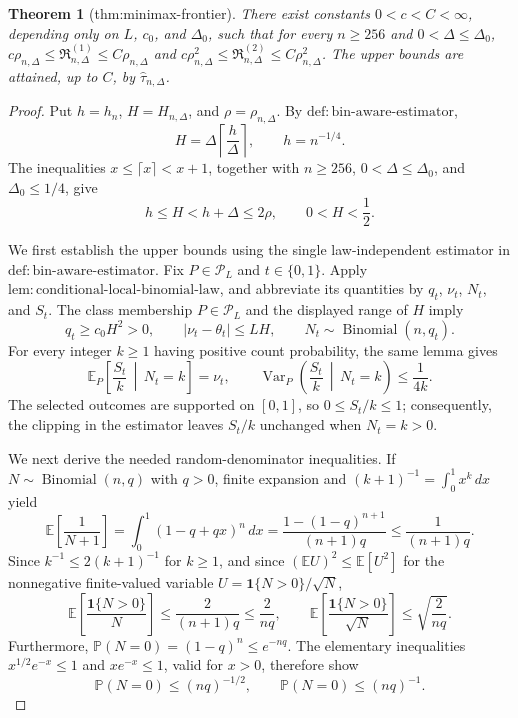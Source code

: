 \documentclass{article}
\newtheorem{theorem}{Theorem}
\begin{document}
\begin{theorem}[thm:minimax-frontier]\label{thm:minimax-frontier}
There exist constants \(0<c<C<\infty\), depending only on \(L\), \(c_0\), and \(\Delta_0\), such that for every \(n\geq256\) and \(0<\Delta\leq\Delta_0\), \(c\rho_{n,\Delta}\leq\mathfrak R^{(1)}_{n,\Delta}\leq C\rho_{n,\Delta}\) and \(c\rho_{n,\Delta}^2\leq\mathfrak R^{(2)}_{n,\Delta}\leq C\rho_{n,\Delta}^2\). The upper bounds are attained, up to \(C\), by \(\widehat\tau_{n,\Delta}\).
\end{theorem}
\begin{proof}
Put \(h=h_n\), \(H=H_{n,\Delta}\), and \(\rho=\rho_{n,\Delta}\).  By \(\mathrm{def:bin\text{-}aware\text{-}estimator}\),
\[
 H=\Delta\left\lceil\frac{h}{\Delta}\right\rceil,
 \qquad h=n^{-1/4}.
\]
The inequalities \(x\leq\lceil x\rceil<x+1\), together with \(n\geq256\), \(0<\Delta\leq\Delta_0\), and \(\Delta_0\leq1/4\), give
\[
 h\leq H<h+\Delta\leq2\rho,
 \qquad 0<H<\frac12.
\]

We first establish the upper bounds using the single law-independent estimator in \(\mathrm{def:bin\text{-}aware\text{-}estimator}\).  Fix \(P\in\mathcal P_L\) and \(t\in\{0,1\}\).  Apply \(\mathrm{lem:conditional\text{-}local\text{-}binomial\text{-}law}\), and abbreviate its quantities by \(q_t\), \(\nu_t\), \(N_t\), and \(S_t\).  The class membership \(P\in\mathcal P_L\) and the displayed range of \(H\) imply
\[
 q_t\geq c_0H^2>0,
 \qquad |\nu_t-\theta_t|\leq LH,
 \qquad N_t\sim\operatorname{Binomial}(n,q_t).
\]
For every integer \(k\geq1\) having positive count probability, the same lemma gives
\[
 \mathbb E_P\!\left[\frac{S_t}{k}\,\middle|\,N_t=k\right]=\nu_t,
 \qquad
 \operatorname{Var}_P\!\left(\frac{S_t}{k}\,\middle|\,N_t=k\right)\leq\frac1{4k}.
\]
The selected outcomes are supported on \([0,1]\), so \(0\leq S_t/k\leq1\); consequently, the clipping in the estimator leaves \(S_t/k\) unchanged when \(N_t=k>0\).

We next derive the needed random-denominator inequalities.  If \(N\sim\operatorname{Binomial}(n,q)\) with \(q>0\), finite expansion and \((k+1)^{-1}=\int_0^1x^k\,dx\) yield
\[
 \mathbb E\!\left[\frac1{N+1}\right]
 =\int_0^1(1-q+qx)^n\,dx
 =\frac{1-(1-q)^{n+1}}{(n+1)q}
 \leq\frac1{(n+1)q}.
\]
Since \(k^{-1}\leq2(k+1)^{-1}\) for \(k\geq1\), and since \((\mathbb E U)^2\leq\mathbb E[U^2]\) for the nonnegative finite-valued variable \(U=\mathbf1\{N>0\}/\sqrt N\),
\[
 \mathbb E\!\left[\frac{\mathbf1\{N>0\}}N\right]
 \leq\frac2{(n+1)q}
 \leq\frac2{nq},
 \qquad
 \mathbb E\!\left[\frac{\mathbf1\{N>0\}}{\sqrt N}\right]
 \leq\sqrt{\frac2{nq}}.
\]
Furthermore, \(\mathbb P(N=0)=(1-q)^n\leq e^{-nq}\).  The elementary inequalities \(x^{1/2}e^{-x}\leq1\) and \(xe^{-x}\leq1\), valid for \(x>0\), therefore show
\[
 \mathbb P(N=0)\leq(nq)^{-1/2},
 \qquad
 \mathbb P(N=0)\leq(nq)^{-1}.
\]


\end{proof}
\end{document}
